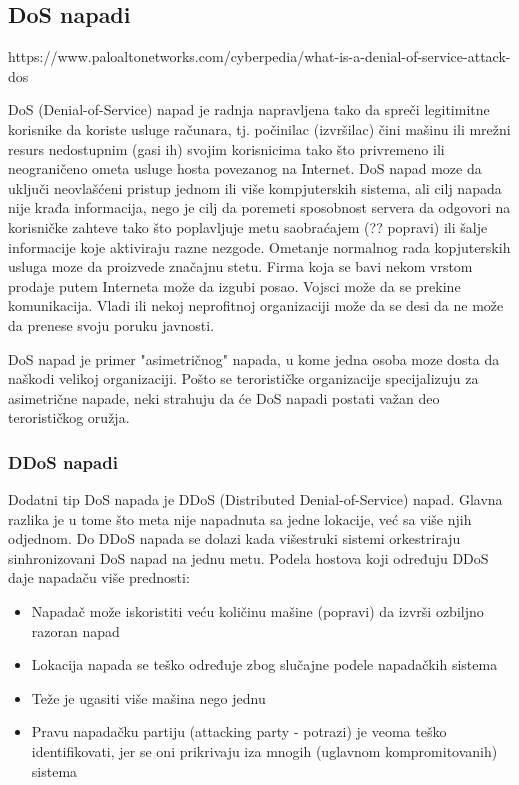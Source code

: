 \documentclass[a4paper]{article}
\begin{document}
\subsection{DoS napadi}
\label{subsec:DoS}

https://www.paloaltonetworks.com/cyberpedia/what-is-a-denial-of-service-attack-dos

DoS (Denial-of-Service) napad je radnja napravljena tako da spreči legitimitne korisnike da koriste usluge računara, tj. počinilac (izvršilac) čini mašinu ili mrežni resurs nedostupnim (gasi ih) svojim korisnicima tako što privremeno ili neograničeno ometa usluge hosta povezanog na Internet. DoS napad moze da uključi neovlašćeni pristup jednom ili više kompjuterskih sistema, ali cilj napada nije krađa informacija, nego je cilj da poremeti sposobnost servera da odgovori na korisničke zahteve tako što poplavljuje metu saobraćajem (?? popravi) ili šalje informacije koje aktiviraju razne nezgode. Ometanje normalnog rada kopjuterskih usluga moze da proizvede značajnu stetu. Firma koja se bavi nekom vrstom prodaje putem Interneta može da izgubi posao. Vojsci može da se prekine komunikacija. Vladi ili nekoj neprofitnoj organizaciji može da se desi da ne može da prenese svoju poruku javnosti.

DoS napad je primer "asimetričnog" napada, u kome jedna osoba moze dosta da naškodi velikoj organizaciji. Pošto se terorističke organizacije specijalizuju za asimetrične napade, neki strahuju da će DoS napadi postati važan deo terorističkog oružja.

\subsubsection{DDoS napadi}
\label{subsubsec:DDoS}

Dodatni tip DoS napada je DDoS (Distributed Denial-of-Service) napad. Glavna razlika je u tome što meta nije napadnuta sa jedne lokacije, već sa više njih odjednom. Do DDoS napada se dolazi kada višestruki sistemi orkestriraju sinhronizovani DoS napad na jednu metu. Podela hostova koji određuju DDoS daje napadaču više prednosti:
\begin{itemize}
\item Napadač može iskoristiti veću količinu mašine (popravi) da izvrši ozbiljno razoran napad
\item Lokacija napada se teško određuje zbog slučajne podele napadačkih sistema
\item Teže je ugasiti više mašina nego jednu
\item Pravu napadačku partiju (attacking party - potrazi) je veoma teško identifikovati, jer se oni prikrivaju iza mnogih (uglavnom kompromitovanih) sistema
\end{itemize}
\end{document}
